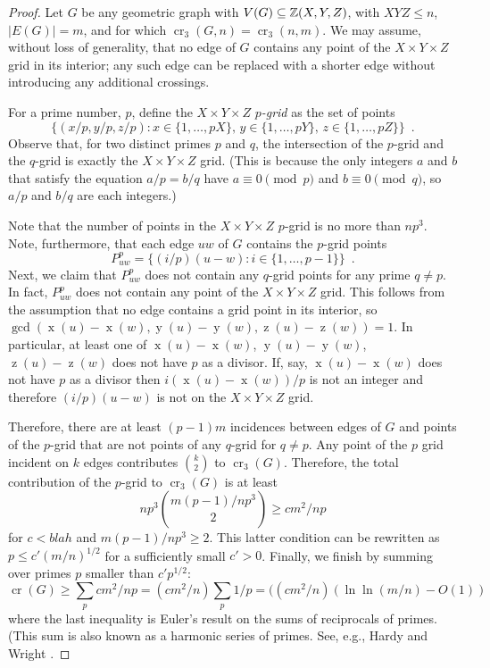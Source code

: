 \documentclass{patmorin}
\DeclareMathOperator{\x}{x}
\DeclareMathOperator{\y}{y}
\DeclareMathOperator{\z}{z}
\DeclareMathOperator{\crs}{cr}
\begin{document}
\begin{proof}
Let $G$ be any geometric graph with $V(G)\subseteq\mathbb{Z}(X,Y,Z)$, with $XYZ\le
n$, $|E(G)|=m$, and for which $\crs_3(G,n)=\crs_3(n,m)$.  We may assume,
without loss of generality, that no edge of $G$ contains any point of the
$X\times Y\times Z$ grid in its interior; any such edge can be replaced
with a shorter edge without introducing any additional crossings.

For a prime number, $p$, define the $X\times Y\times Z$ \emph{$p$-grid}
as the set of points
\[
  \{(x/p,y/p,z/p): x\in\{1,\ldots,pX\},\, y\in\{1,\ldots,pY\},\,
  z\in\{1,\ldots,pZ\}\} \enspace .
\]
Observe that, for two distinct primes $p$ and $q$, the intersection
of the $p$-grid and the $q$-grid is exactly the $X\times Y\times Z$
grid. (This is because the only integers $a$ and $b$ that satisfy the
equation $a/p = b/q$ have $a\equiv 0 \pmod{p}$ and $b\equiv 0\pmod q$,
so $a/p$ and $b/q$ are each integers.)

Note that the number of points in the $X\times Y\times Z$ $p$-grid is
no more than $np^3$.  Note, furthermore, that each edge $uw$ of $G$
contains the $p$-grid points
\[
    P_{uw}^p = \{ (i/p)(u-w) : i\in\{1,\ldots,p-1\} \} \enspace .
\]
Next, we claim that $P_{uw}^p$ does not contain any $q$-grid points for
any prime $q\neq p$.  In fact, $P_{uw}^p$ does not contain any point of
the $X\times Y\times Z$ grid.  This follows from the assumption that
no edge contains a grid point in its interior, so $\gcd(\x(u)-\x(w),
\y(u)-\y(w), \z(u)-\z(w))=1$.  In particular, at least one of
$\x(u)-\x(w)$, $\y(u)-\y(w)$, $\z(u)-\z(w)$ does not have $p$ as a
divisor.  If, say, $\x(u)-\x(w)$ does not have $p$ as a divisor then
$i(\x(u)-\x(w))/p$ is not an integer and therefore $(i/p)(u-w)$ is not
on the $X\times Y\times Z$ grid.

Therefore, there are at least $(p-1)m$ incidences between edges of $G$ and
points of the $p$-grid that are not points of any $q$-grid for $q\neq p$.
Any point of the $p$ grid incident on $k$ edges contributes $\binom{k}{2}$
to $\crs_3(G)$.  Therefore, the total contribution of the $p$-grid to
$\crs_3(G)$ is at least
\[
    np^3\binom{m(p-1)/np^3}{2} \ge cm^2/np
\]
for $c<blah$ and $m(p-1)/np^3 \ge 2$.  This latter condition can be
rewritten as $p \le c'(m/n)^{1/2}$ for a sufficiently small $c'>0$.
Finally, we finish by summing over primes $p$ smaller than $c'p^{1/2}$:
\[
   \crs(G) \ge \sum_{p} cm^2/np = (cm^2/n) \sum_{p} 1/p = ((cm^2/n)(\ln\ln(m/n)-O(1))
\]
where the last inequality is Euler's result on the sums of reciprocals
of primes. (This sum is also known as a harmonic series of primes.  See,
e.g., Hardy and Wright \cite{hw79}.
\end{proof}
\end{document}

